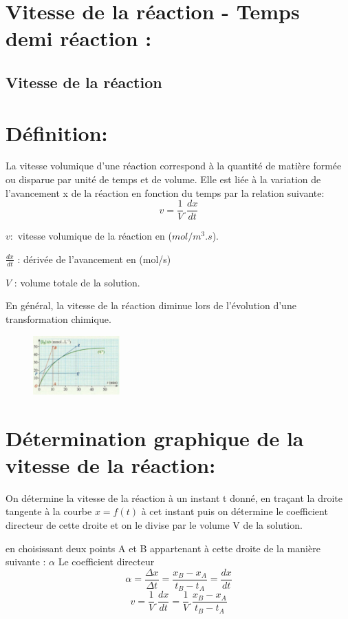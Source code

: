 \documentclass[12pt]{article}
\begin{document}
\section{Vitesse de la réaction - Temps demi réaction :  }
\subsection{Vitesse de la réaction}
\section*{Définition:}
La vitesse volumique d’une réaction correspond à la quantité de matière formée ou disparue par unité de temps et de volume.
Elle est liée à la variation de l’avancement x de la réaction en fonction du temps par la relation suivante:
$$v = \frac{1}{V}.\frac{dx}{dt}$$

$v : $ vitesse volumique de la réaction en ($mol/m^3.s$).

$\frac{dx}{dt}$ : dérivée de l'avancement en (mol/s)

$V$ : volume totale de la solution.

En général, la vitesse de la réaction diminue lors de l'évolution d'une transformation chimique.

\begin{figure}
	\vspace{-1.5cm}
	\includegraphics[width=0.3\textwidth]{./img/STvitesse.png}
\end{figure}


\section*{Détermination graphique de la vitesse de la réaction:}
On détermine la vitesse de la réaction à un instant t donné, en traçant la droite tangente à la courbe $x=f(t)$ à cet instant puis on détermine le coefficient directeur de cette droite et on le divise par le volume V de la solution.

 en choisissant deux points A et B appartenant à cette droite de la manière suivante : $\alpha$
Le coefficient directeur
$$\alpha = \frac{\Delta{x}}{\Delta{t}} = \frac{x_B - x_A}{t_B - t_A} = \frac{dx}{dt}$$
$$v = \frac{1}{V}.\frac{dx}{dt} = \frac{1}{V}.\frac{x_B - x_A}{t_B - t_A}$$
\end{document}
